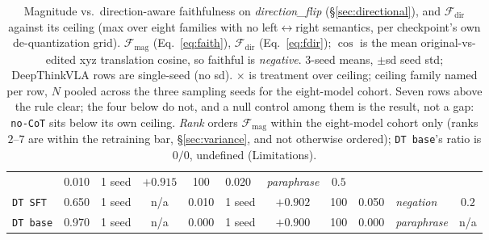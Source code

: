 \documentclass{article}
\begin{document}
\begin{table}[t]
{\begin{tabular}{@{}l c@{\ }l c c@{\ }l c c c l c@{}}
  & 0.010 & {\footnotesize 1 seed} & $+0.915$ & 100 & 0.020 & {\footnotesize\emph{paraphrase}} & $\mathbf{0.5}$ \\
\texttt{DT SFT} & 0.650 & {\footnotesize 1 seed} & n/a
  & 0.010 & {\footnotesize 1 seed} & $+0.902$ & 100 & 0.050 & {\footnotesize\emph{negation}} & $\mathbf{0.2}$ \\
\texttt{DT base} & 0.970 & {\footnotesize 1 seed} & n/a
  & 0.000 & {\footnotesize 1 seed} & $+0.900$ & 100 & 0.000 & {\footnotesize\emph{paraphrase}} & n/a \\
\bottomrule
\end{tabular}}
\caption{Magnitude vs.\ direction-aware faithfulness on \emph{direction\_flip} (\S\ref{sec:directional}), and $\mathcal{F}_{\text{dir}}$ against its ceiling (max over eight families with no left$\leftrightarrow$right semantics, per checkpoint's own de-quantization grid). $\mathcal{F}_{\text{mag}}$ (Eq.~\ref{eq:faith}), $\mathcal{F}_{\text{dir}}$ (Eq.~\ref{eq:fdir}); $\cos$ is the mean original-vs-edited xyz translation cosine, so faithful is \emph{negative}. 3-seed means, $\pm$sd seed std; DeepThinkVLA rows are single-seed (no sd). $\times$ is treatment over ceiling; ceiling family named per row, $N$ pooled across the three sampling seeds for the eight-model cohort. Seven rows above the rule clear; the four below do not, and a null control among them is the result, not a gap: \texttt{no-CoT} sits below its own ceiling. \emph{Rank} orders $\mathcal{F}_{\text{mag}}$ within the eight-model cohort only (ranks $2$--$7$ are within the retraining bar, \S\ref{sec:variance}, and not otherwise ordered); \texttt{DT base}'s ratio is $0/0$, undefined (Limitations).}
\label{tab:directional}
\label{tab:fdirnull}
\end{table}
\end{document}
